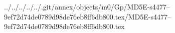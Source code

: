 ../../../../../.git/annex/objects/m0/Gp/MD5E-s4477--9ef72d74de0789d98de76eb8ff6db800.tex/MD5E-s4477--9ef72d74de0789d98de76eb8ff6db800.tex